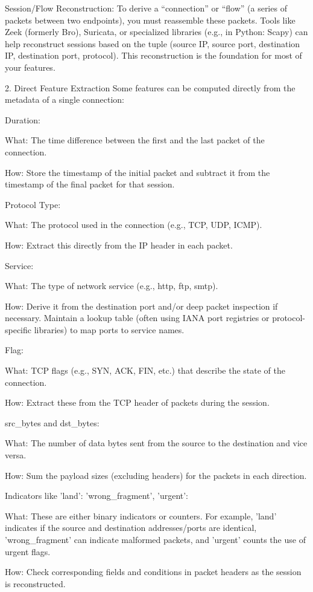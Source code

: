 \documentclass{article}
\begin{document}
Session/Flow Reconstruction:
To derive a “connection” or “flow” (a series of packets between two endpoints), you must reassemble these packets. Tools like Zeek (formerly Bro), Suricata, or specialized libraries (e.g., in Python: Scapy) can help reconstruct sessions based on the tuple (source IP, source port, destination IP, destination port, protocol). This reconstruction is the foundation for most of your features.

2. Direct Feature Extraction
Some features can be computed directly from the metadata of a single connection:

Duration:

What: The time difference between the first and the last packet of the connection.

How: Store the timestamp of the initial packet and subtract it from the timestamp of the final packet for that session.

Protocol Type:

What: The protocol used in the connection (e.g., TCP, UDP, ICMP).

How: Extract this directly from the IP header in each packet.

Service:

What: The type of network service (e.g., http, ftp, smtp).

How: Derive it from the destination port and/or deep packet inspection if necessary. Maintain a lookup table (often using IANA port registries or protocol-specific libraries) to map ports to service names.

Flag:

What: TCP flags (e.g., SYN, ACK, FIN, etc.) that describe the state of the connection.

How: Extract these from the TCP header of packets during the session.

src_bytes and dst_bytes:

What: The number of data bytes sent from the source to the destination and vice versa.

How: Sum the payload sizes (excluding headers) for the packets in each direction.

Indicators like 'land': 'wrong_fragment', 'urgent':

What: These are either binary indicators or counters. For example, 'land' indicates if the source and destination addresses/ports are identical, 'wrong_fragment' can indicate malformed packets, and 'urgent' counts the use of urgent flags.

How: Check corresponding fields and conditions in packet headers as the session is reconstructed.
\end{document}
